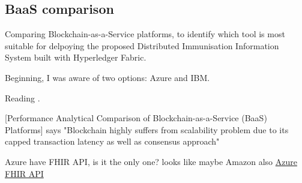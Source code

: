 \documentclass{article}
\begin{document}
\begin{flushleft}
\section{BaaS comparison}
Comparing Blockchain-as-a-Service platforms, to identify which tool is most suitable for delpoying the proposed Distributed Immunisation Information System built with Hyperledger Fabric.\linebreak[1]

Beginning, I was aware of two options: Azure and IBM.\linebreak[1]

Reading \cite{onik_performance_2019}.\linebreak[1]

[Performance Analytical Comparison of Blockchain-as-a-Service (BaaS) Platforms] says "Blockchain highly suffers from scalability problem due to its capped transaction
latency as well as consensus approach"\linebreak[1]

Azure have FHIR API, is it the only one? looks like maybe Amazon also \href{'https://azure.microsoft.com/en-gb/services/azure-api-for-fhir/?ocid=AID754288&wt.mc_id=azfr-c9-scottha%2CCFID0475'}{Azure FHIR API}




\end{flushleft}

\printbibliography
\end{document}
